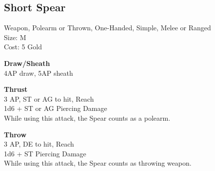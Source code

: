 \subsection{Short Spear}\label{weapon:shortSpear}
Weapon, Polearm or Thrown, One-Handed, Simple, Melee or Ranged\\
Size: M\\
Cost: 5 Gold

\textbf{Draw/Sheath}\\
4AP draw, 5AP sheath

\textbf{Thrust}\\
3 AP, ST or AG to hit,  Reach\\
1d6 + \texttimes ST or AG Piercing Damage\\
While using this attack, the Spear counts as a polearm.

\textbf{Throw}\\
3 AP, DE to hit,  Reach\\
1d6 + \texttimes ST Piercing Damage\\
While using this attack, the Spear counts as throwing weapon.

